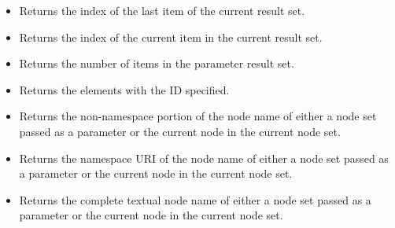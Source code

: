 \documentclass[20pt,landscape,headrule,footrule]{foils}
\begin{document}
\begin{minipage}{\textwidth}
\small
\begin{itemize}
  \item {}
    Returns the index of the last item of the current result
    set.  
  \item {}
    Returns the index of the current item in the current result set.
  \item {}
    Returns the number of items in the parameter result set.
  \item {}
    Returns the elements with the ID specified.
\end{itemize}
\end{minipage}

\begin{minipage}{\textwidth}
\small
\begin{itemize}
  \item {}
    Returns the non-namespace portion of the node name of either
    a node set passed as a parameter or the current node in the
    current node set.
  \item {}
    Returns the namespace URI of the node name of either 
    a node set passed as a parameter or the current node in the
    current node set.
  \item {}
    Returns the complete textual node name of either a node set
    passed as a parameter or the current node in the current
    node set.
      \egxpath{/*[\hiblue{name()}="soap:Envelope"]}
\end{itemize}
\end{minipage}

\end{document}
